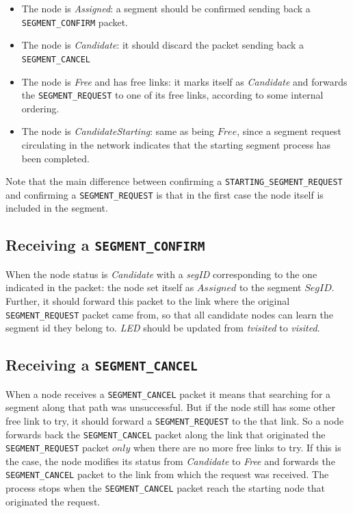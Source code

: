 \begin{itemize}
\item The node is \emph{Assigned}: a segment should be confirmed
sending back a \texttt{SEGMENT\_CONFIRM} packet.
\item The node is \emph{Candidate}: it should discard the packet sending
back a \texttt{SEGMENT\_CANCEL} 
\item The node is \emph{Free} and has free
links: it marks itself as \emph{Candidate} and forwards the \texttt{SEGMENT\_REQUEST}
to one of its free links, according to some internal ordering.
\item The node is \emph{CandidateStarting}: same as being $Free$,
since a segment request circulating in the network indicates that the
starting segment process has been completed.
\end{itemize}

Note that the main difference between confirming a \texttt{STARTING\_SEGMENT\_REQUEST}
and confirming a \texttt{SEGMENT\_REQUEST} is that in the first case the node
itself is included in the segment.


\subsection{Receiving a \texttt{SEGMENT\_CONFIRM}}
When the node status is \emph{Candidate} with a \emph{segID} corresponding to the one indicated in
the packet: the node set itself as $Assigned$ to the segment $SegID$. Further, it should forward this packet to the link where the
original \texttt{SEGMENT\_REQUEST} packet came from, so that all candidate nodes
can learn the segment id they belong to. \emph{LED} should be
updated from \emph{tvisited} to \emph{visited}.

\subsection{Receiving a \texttt{SEGMENT\_CANCEL}}
When a node receives a \texttt{SEGMENT\_CANCEL} packet it means that
searching for a segment along that path was unsuccessful. But if the
node still has some other free link to try, it should forward a
\texttt{SEGMENT\_REQUEST} to the that link. So a node forwards back
the \texttt{SEGMENT\_CANCEL} packet along the link that originated the
\texttt{SEGMENT\_REQUEST} packet $only$ when there are no more free
links to try. If this is the case, the node modifies its status from
\emph{Candidate} to \emph{Free} and forwards the
\texttt{SEGMENT\_CANCEL} packet to the link from which the request was
received. The process stops when the \texttt{SEGMENT\_CANCEL} packet
reach the starting node that originated the request.

